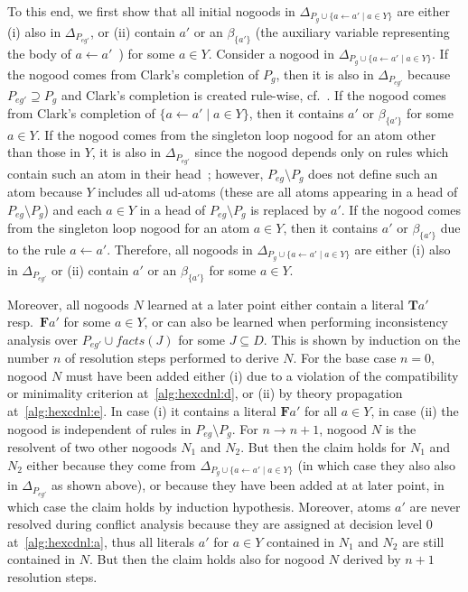 \documentclass[11pt,fleqn,twoside]{article}
\newcommand{\T}{\mathbf{T}}
\newcommand{\F}{\mathbf{F}}
\newcommand{\Program}{\ensuremath{P}}
\newcommand{\toFacts}[1]{\mathit{facts}(#1)}
\begin{document}
{				To this end,
				we first show that all initial nogoods in $\Delta_{\Program_g \cup \{ a \leftarrow a' \mid a \in Y \}}$ are either
				(i) also in $\Delta_{\Program_{\mathit{eg}'}}$,
				or (ii) contain $a'$ or an $\beta_{\{a'\}}$ (the auxiliary variable representing the body of $a \leftarrow a'$~\cite{c1977}) for some $a \in Y$.
				Consider a nogood in $\Delta_{\Program_g \cup \{ a \leftarrow a' \mid a \in Y \}}$.
				If the nogood comes from Clark's completion of $\Program_g$, then it is also in $\Delta_{\Program_{\mathit{eg}'}}$ because $\Program_{\mathit{eg}'} \supseteq \Program_g$ and Clark's completion is created rule-wise, cf.~.
				If the nogood comes from Clark's completion of $\{ a \leftarrow a' \mid a \in Y \}$, then it contains $a'$ or $\beta_{\{ a' \}}$ for some $a \in Y$.
				If the nogood comes from the singleton loop nogood for an atom other than those in $Y$, it is also in $\Delta_{\Program_{\mathit{eg}'}}$ since the nogood depends only on rules which contain such an atom in their head~\cite{Drescher08conflict-drivendisjunctive};
					however, $\Program_{\mathit{eg}} \setminus \Program_g$ does not define such an atom because $Y$ includes all ud-atoms (these are all atoms appearing in a head of $\Program_{\mathit{eg}} \setminus \Program_g$) and each $a \in Y$ in a head of $\Program_{\mathit{eg}} \setminus \Program_g$ is replaced by $a'$.
				If the nogood comes from the singleton loop nogood for an atom $a \in Y$, then it contains $a'$ or $\beta_{\{ a' \}}$ due to the rule $a \leftarrow a'$.
				Therefore, all nogoods in $\Delta_{\Program_g \cup \{ a \leftarrow a' \mid a \in Y \}}$ are either (i) also in $\Delta_{\Program_{\mathit{eg}'}}$ or (ii) contain $a'$ or an $\beta_{\{a'\}}$ for some $a \in Y$.

				Moreover, all nogoods $N$ learned at a later point either contain a literal $\T a'$ resp.~$\F a'$ for some $a \in Y$, or can also be learned when performing inconsistency analysis over $\Program_{\mathit{eg}'} \cup \toFacts{J}$ for some $J \subseteq D$.
				This is shown by induction on the number $n$ of resolution steps performed to derive $N$.
					For the base case $n = 0$, nogood $N$ must have been added either
						(i) due to a violation of the compatibility or minimality criterion at~\ref{alg:hexcdnl:d},
						or (ii) by theory propagation at~\ref{alg:hexcdnl:e}.
						In case (i) it contains a literal $\F a'$ for all $a \in Y$,
						in case (ii) the nogood is independent of rules in $\Program_{\mathit{eg}} \setminus \Program_g$.
					For $n \rightarrow n + 1$, nogood $N$ is the resolvent of two other nogoods $N_1$ and $N_2$.
						But then the claim holds for $N_1$ and $N_2$ either because they come from $\Delta_{\Program_g \cup \{ a \leftarrow a' \mid a \in Y \}}$
						(in which case they also also in $\Delta_{\Program_{\mathit{eg}'}}$ as shown above),
						or because they have been added at at later point, in which case the claim holds by induction hypothesis.
						Moreover, atoms $a'$ are never resolved during conflict analysis because they are assigned at decision level $0$ at~\ref{alg:hexcdnl:a},
						thus all literals $a'$ for $a \in Y$ contained in $N_1$ and $N_2$ are still contained in $N$. But then the claim holds also for nogood $N$ derived by $n + 1$ resolution steps.

}
\end{document}
